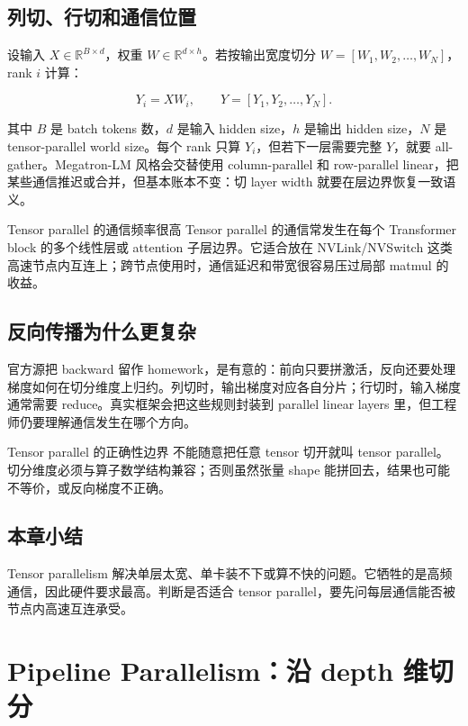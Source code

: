 \documentclass[a4paper]{article}
\begin{document}
\subsection{列切、行切和通信位置}

设输入 \(X\in\mathbb{R}^{B\times d}\)，权重 \(W\in\mathbb{R}^{d\times h}\)。若按输出宽度切分 \(W=[W_1,W_2,\dots,W_N]\)，rank \(i\) 计算：

\[
Y_i = X W_i,\qquad
Y = [Y_1,Y_2,\dots,Y_N].
\]

其中 \(B\) 是 batch tokens 数，\(d\) 是输入 hidden size，\(h\) 是输出 hidden size，\(N\) 是 tensor-parallel world size。每个 rank 只算 \(Y_i\)，但若下一层需要完整 \(Y\)，就要 all-gather。Megatron-LM 风格会交替使用 column-parallel 和 row-parallel linear，把某些通信推迟或合并，但基本账本不变：切 layer width 就要在层边界恢复一致语义。

\begin{importantbox}{Tensor parallel 的通信频率很高}
Tensor parallel 的通信常发生在每个 Transformer block 的多个线性层或 attention 子层边界。它适合放在 NVLink/NVSwitch 这类高速节点内互连上；跨节点使用时，通信延迟和带宽很容易压过局部 matmul 的收益。
\end{importantbox}

\subsection{反向传播为什么更复杂}

官方源把 backward 留作 homework，是有意的：前向只要拼激活，反向还要处理梯度如何在切分维度上归约。列切时，输出梯度对应各自分片；行切时，输入梯度通常需要 reduce。真实框架会把这些规则封装到 parallel linear layers 里，但工程师仍要理解通信发生在哪个方向。

\begin{warningbox}{Tensor parallel 的正确性边界}
不能随意把任意 tensor 切开就叫 tensor parallel。切分维度必须与算子数学结构兼容；否则虽然张量 shape 能拼回去，结果也可能不等价，或反向梯度不正确。
\end{warningbox}

\subsection{本章小结}

Tensor parallelism 解决单层太宽、单卡装不下或算不快的问题。它牺牲的是高频通信，因此硬件要求最高。判断是否适合 tensor parallel，要先问每层通信能否被节点内高速互连承受。

\section{Pipeline Parallelism：沿 depth 维切分}
\end{document}
